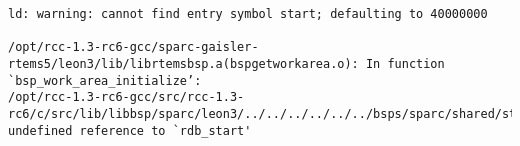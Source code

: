 
\noindent\begin{minipage}{\textwidth}
\begin{lstlisting}[language={}]
ld: warning: cannot find entry symbol start; defaulting to 40000000

/opt/rcc-1.3-rc6-gcc/sparc-gaisler-rtems5/leon3/lib/librtemsbsp.a(bspgetworkarea.o): In function `bsp_work_area_initialize’:
/opt/rcc-1.3-rc6-gcc/src/rcc-1.3- rc6/c/src/lib/libbsp/sparc/leon3/../../../../../../bsps/sparc/shared/start/bspgetworkarea.c:32: undefined reference to `rdb_start'
\end{lstlisting}
\end{minipage}